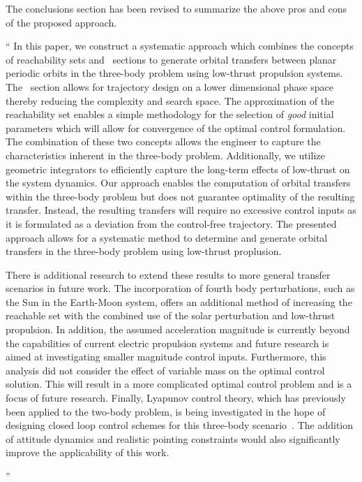 \documentclass[11pt]{article}
\newenvironment{correction}{\begin{list}{}{\setlength{\leftmargin}{1cm}\setlength{\rightmargin}{1cm}}\vspace{\parsep}\item[]``}{''\end{list}}
\begin{document}
The conclusions section has been revised to summarize the above pros and cons of the proposed approach. 
\begin{correction}
In this paper, we construct a systematic approach which combines the concepts of reachability sets and \Poincare~sections to generate orbital transfers between planar periodic orbits in the three-body problem using low-thrust propulsion systems.
The \Poincare~section allows for trajectory design on a lower dimensional phase space thereby reducing the complexity and search space.
The approximation of the reachability set enables a simple methodology for the selection of \textit{good} initial parameters which will allow for convergence of the optimal control formulation.
The combination of these two concepts allows the engineer to capture the characteristics inherent in the three-body problem.
Additionally, we utilize geometric integrators to efficiently capture the long-term effects of low-thrust on the system dynamics.
Our approach enables the computation of orbital transfers within the three-body problem but does not guarantee optimality of the resulting transfer.
Instead, the resulting transfers will require no excessive control inputs as it is formulated as a deviation from the control-free trajectory.
The presented approach allows for a systematic method to determine and generate orbital transfers in the three-body problem using low-thrust proplusion.

There is additional research to extend these results to more general transfer scenarios in future work.
The incorporation of fourth body perturbations, such as the Sun in the Earth-Moon system, offers an additional method of increasing the reachable set with the combined use of the solar perturbation and low-thrust propulsion.
In addition, the assumed acceleration magnitude is currently beyond the capabilities of current electric propulsion systems and future research is aimed at investigating smaller magnitude control inputs.
Furthermore, this analysis did not consider the effect of variable mass on the optimal control solution.
This will result in a more complicated optimal control problem and is a focus of future research.
Finally, Lyapunov control theory, which has previously been applied to the two-body problem, is being investigated in the hope of designing closed loop control schemes for this three-body scenario~\cite{chang2002}.
The addition of attitude dynamics and realistic pointing constraints would also significantly improve the applicability of this work.

\end{correction}
\end{document}
